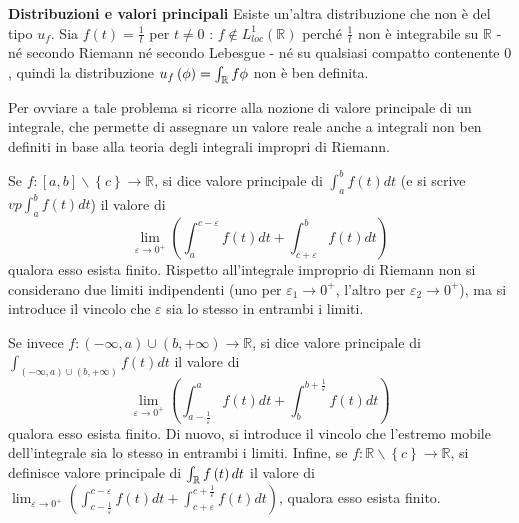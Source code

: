 \documentclass{article}
\begin{document}
\textbf{Distribuzioni e valori principali }Esiste un'altra distribuzione che
non \`{e} del tipo $u_{f}$. Sia $f\left( t\right) =\frac{1}{t}$ per $t\neq 0$%
: $f\not\in L_{loc}^{1}\left( 
\mathbb{R}
\right) $ perch\'{e} $\frac{1}{t}$ non \`{e} integrabile su $%
\mathbb{R}
$ - n\'{e} secondo Riemann n\'{e} secondo Lebesgue - n\'{e} su qualsiasi
compatto contenente $0$, quindi la distribuzione $u_{f}\left( \phi \right)
=\int_{%
\mathbb{R}
}f\phi $ non \`{e} ben definita.

Per ovviare a tale problema si ricorre alla nozione di valore principale di
un integrale, che permette di assegnare un valore reale anche a integrali
non ben definiti in base alla teoria degli integrali impropri di Riemann.

Se $f:\left[ a,b\right] \backslash \left\{ c\right\} \rightarrow 
\mathbb{R}
$, si dice valore principale di $\int_{a}^{b}f\left( t\right) dt$ (e si
scrive $vp\int_{a}^{b}f\left( t\right) dt$) il valore di 
\begin{equation*}
\lim_{\varepsilon
\rightarrow 0^{+}}\left( \int_{a}^{c-\varepsilon }f\left( t\right)
dt+\int_{c+\varepsilon }^{b}f\left( t\right) dt\right)
\end{equation*}
qualora esso
esista finito. Rispetto all'integrale improprio di Riemann non si
considerano due limiti indipendenti (uno per $\varepsilon _{1}\rightarrow
0^{+}$, l'altro per $\varepsilon _{2}\rightarrow 0^{+}$), ma si introduce il
vincolo che $\varepsilon $ sia lo stesso in entrambi i limiti.

Se invece $f:\left( -\infty ,a\right) \cup \left( b,+\infty \right)
\rightarrow 
\mathbb{R}
$, si dice valore principale di $\int_{\left( -\infty ,a\right) \cup \left(
b,+\infty \right) }f\left( t\right) dt$ il valore di 
\begin{equation*}
\lim_{\varepsilon
\rightarrow 0^{+}}\left( \int_{a-\frac{1}{\varepsilon }}^{a}f\left( t\right)
dt+\int_{b}^{b+\frac{1}{\varepsilon }}f\left( t\right) dt\right)
\end{equation*}
qualora
esso esista finito. Di nuovo, si introduce il vincolo che l'estremo mobile
dell'integrale sia lo stesso in entrambi i limiti. Infine, se $f:%
\mathbb{R}
\backslash \left\{ c\right\} \rightarrow 
\mathbb{R}
$, si definisce valore principale di $\int_{%
\mathbb{R}
}f\left( t\right) dt$ il valore di $\lim_{\varepsilon \rightarrow
0^{+}}\left( \int_{c-\frac{1}{\varepsilon }}^{c-\varepsilon }f\left(
t\right) dt+\int_{c+\varepsilon }^{c+\frac{1}{\varepsilon }}f\left( t\right)
dt\right) $, qualora esso esista finito.
\end{document}
